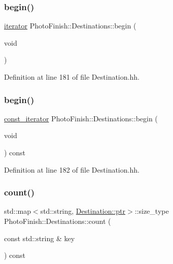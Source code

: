 \subsubsection{\texorpdfstring{begin()}{begin()}\hspace{0.1cm}{\footnotesize\ttfamily [1/2]}}
{\footnotesize\ttfamily \hyperlink{class_photo_finish_1_1_destinations_adb2cf9240b0d2545643caa2c1d718913}{iterator} Photo\+Finish\+::\+Destinations\+::begin (\begin{DoxyParamCaption}\item[{void}]{ }\end{DoxyParamCaption})\hspace{0.3cm}{\ttfamily [inline]}}



Definition at line 181 of file Destination.\+hh.

\mbox{\label{class_photo_finish_1_1_destinations_aaa8d1fbda8e89ec3e2c8aca5d77e9548}} 
\subsubsection{\texorpdfstring{begin()}{begin()}\hspace{0.1cm}{\footnotesize\ttfamily [2/2]}}
{\footnotesize\ttfamily \hyperlink{class_photo_finish_1_1_destinations_a267e114a259d98ae440074660c7086cb}{const\+\_\+iterator} Photo\+Finish\+::\+Destinations\+::begin (\begin{DoxyParamCaption}\item[{void}]{ }\end{DoxyParamCaption}) const\hspace{0.3cm}{\ttfamily [inline]}}



Definition at line 182 of file Destination.\+hh.

\mbox{\label{class_photo_finish_1_1_destinations_a7e7108f13b73dc445874779ed4ecf5d8}} 
\subsubsection{\texorpdfstring{count()}{count()}}
{\footnotesize\ttfamily std\+::map$<$std\+::string, \hyperlink{class_photo_finish_1_1_destination_a0d282a905cd81c3f0e6d7233c9bc7774}{Destination\+::ptr}$>$\+::size\+\_\+type Photo\+Finish\+::\+Destinations\+::count (\begin{DoxyParamCaption}\item[{const std\+::string \&}]{key }\end{DoxyParamCaption}) const\hspace{0.3cm}{\ttfamily [inline]}}



